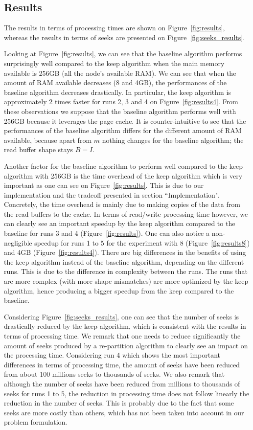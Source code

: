 \documentclass[conference]{IEEEtran}
\begin{document}
\subsection{Results}

The results in terms of processing times are shown on
Figure~\ref{fig:results}, whereas the results in terms of seeks are
presented on Figure~\ref{fig:seeks_results}.

Looking at Figure~\ref{fig:results}, we can see that
the baseline algorithm performs surprisingly well compared to the keep algorithm
when the main memory available is 256GB (all the node's available RAM).
We can see that when the amount of RAM available decreases (8 and 4GB), the
performances of the baseline algorithm decreases drastically.
In particular, the keep algorithm is approximately 2 times faster for runs
2, 3 and 4 on Figure~\ref{fig:results4}.
From these observations we suppose that the baseline algorithm performs well
with 256GB because it leverages the page cache.
It is counter-intuitive to see that the performances of the baseline algorithm
differs for the different amount of RAM available, because apart from $m$
nothing changes for the baseline algorithm; the read buffer shape stays $B=I$.

Another factor for the baseline algorithm to perform well compared to the
keep algorithm with 256GB is the time overhead of the keep algorithm which is
very important as one can see on Figure~\ref{fig:results}.
This is due to our implementation and the tradeoff presented in section
``Implementation".
Concretely, the time overhead is mainly due to making copies of the data from
the read buffers to the cache.
In terms of read/write processing time however, we can clearly see an
important speedup by the keep algorithm compared to the baseline for
runs 3 and 4 (Figure~\ref{fig:results}).
One can also notice a non-negligible speedup for runs 1 to 5 for the experiment
with 8 (Figure~\ref{fig:results8}) and 4GB (Figure~\ref{fig:results4}).
There are big differences in the benefits of using the keep algorithm instead of
the baseline algorithm, depending on the different runs.
This is due to the difference in complexity between the runs.
The runs that are more complex (with more shape mismatches) are more optimized
by the keep algorithm, hence producing a bigger speedup from the keep compared to
the baseline.

Considering Figure~\ref{fig:seeks_results}, one can see that the number of
seeks is drastically reduced by the keep algorithm, which is consistent with
the results in terms of processing time.
We remark that one needs to reduce significantly the amount of seeks produced
by a re-partition algorithm to clearly see an impact on the processing time.
Considering run 4 which shows the most important differences in terms of
processing time, the amount of seeks have been reduced from about 100 millions
seeks to thousands of seeks.
We also remark that although the number of seeks have been reduced from millions
to thousands of seeks for runs 1 to 5, the reduction in processing time does not
follow linearly the reduction in the number of seeks.
This is probably due to the fact that some seeks are more costly than others,
which has not been taken into account in our problem formulation.
\end{document}
